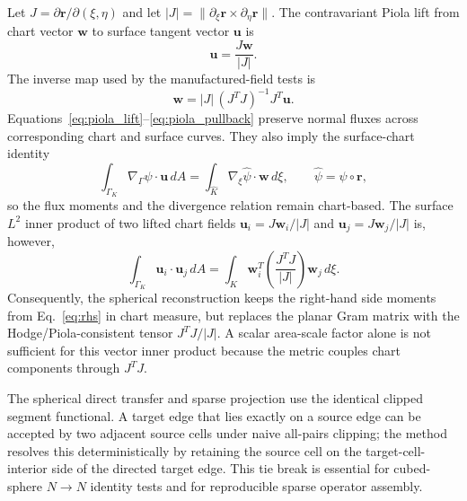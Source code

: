\documentclass[11pt]{article}
\begin{document}
Let \(J=\partial\mathbf{r}/\partial(\xi,\eta)\) and let
\(|J|=\|\partial_\xi\mathbf{r}\times\partial_\eta\mathbf{r}\|\).  The
contravariant Piola lift from chart vector \(\mathbf{w}\) to surface tangent
vector \(\mathbf{u}\) is
\begin{equation}
  \mathbf{u} = \frac{J\mathbf{w}}{|J|}.
  \label{eq:piola_lift}
\end{equation}
The inverse map used by the manufactured-field tests is
\begin{equation}
  \mathbf{w} =
  |J|\,(J^T J)^{-1}J^T\mathbf{u}.
  \label{eq:piola_pullback}
\end{equation}
Equations~\eqref{eq:piola_lift}--\eqref{eq:piola_pullback} preserve normal
fluxes across corresponding chart and surface curves.  They also imply the
surface-chart identity
\begin{equation}
  \int_{\Gamma_K} \nabla_\Gamma \psi \cdot \mathbf{u}\, dA
  =
  \int_{\widehat K} \nabla_{\xi}\widehat\psi \cdot \mathbf{w}\, d\xi,
  \qquad
  \widehat\psi = \psi \circ \mathbf{r},
  \label{eq:piola_moment_identity}
\end{equation}
so the flux moments and the divergence relation remain chart-based.  The
surface \(L^2\) inner product of two lifted chart fields
\(\mathbf{u}_i = J\mathbf{w}_i/|J|\) and \(\mathbf{u}_j = J\mathbf{w}_j/|J|\)
is, however,
\begin{equation}
  \int_{\Gamma_K} \mathbf{u}_i \cdot \mathbf{u}_j\, dA
  =
  \int_{\widehat K} \mathbf{w}_i^T
  \left(\frac{J^T J}{|J|}\right)
  \mathbf{w}_j\, d\xi.
  \label{eq:piola_hodge}
\end{equation}
Consequently, the spherical reconstruction keeps the right-hand side moments
from Eq.~\eqref{eq:rhs} in chart measure, but replaces the planar Gram matrix
with the Hodge/Piola-consistent tensor \(J^T J / |J|\).  A scalar area-scale
factor alone is not sufficient for this vector inner product because the metric
couples chart components through \(J^T J\).

The spherical direct transfer and sparse projection use the identical clipped
segment functional.  A target edge that lies exactly on a source edge can be
accepted by two adjacent source cells under naive all-pairs clipping; the method
resolves this deterministically by retaining the source cell on the
target-cell-interior side of the directed target edge.  This tie break is
essential for cubed-sphere \(N\to N\) identity tests and for reproducible sparse
operator assembly.
\end{document}
